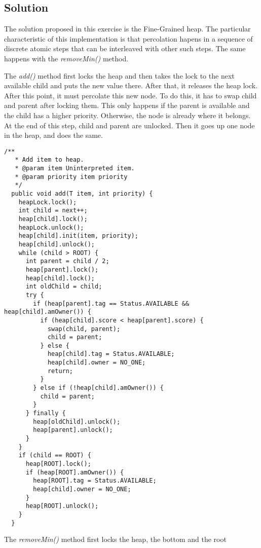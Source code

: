 \subsection{Solution}
\par
The solution proposed in this exercise is the Fine-Grained heap. The particular
characteristic of this implementation is that percolation hapens in a sequence
of discrete atomic steps that can be interleaved with other such steps. The same
happens with the \textit{removeMin()} method.
\par
The \textit{add()} method first locks the heap and then takes the lock to the
next available child and puts the new value there. After that, it releases the
heap lock. After this point, it must percolate this new node. To do this, it has
to swap child and parent after locking them. This only happens if the parent is
available and the child has a higher priority. Otherwise, the node is already
where it belongs. At the end of this step, child and parent are unlocked. Then
it goes up one node in the heap, and does the same.
\par
\hfill
\begin{lstlisting}[style=numbers]
  /**
   * Add item to heap.
   * @param item Uninterpreted item.
   * @param priority item priority
   */
  public void add(T item, int priority) {
    heapLock.lock();
    int child = next++;
    heap[child].lock();
    heapLock.unlock();
    heap[child].init(item, priority);
    heap[child].unlock();
    while (child > ROOT) {
      int parent = child / 2;
      heap[parent].lock();
      heap[child].lock();
      int oldChild = child;
      try {
        if (heap[parent].tag == Status.AVAILABLE && heap[child].amOwner()) {
          if (heap[child].score < heap[parent].score) {
            swap(child, parent);
            child = parent;
          } else {
            heap[child].tag = Status.AVAILABLE;
            heap[child].owner = NO_ONE;
            return;
          }
        } else if (!heap[child].amOwner()) {
          child = parent;
        }
      } finally {
        heap[oldChild].unlock();
        heap[parent].unlock();
      }
    }
    if (child == ROOT) {
      heap[ROOT].lock();
      if (heap[ROOT].amOwner()) {
        heap[ROOT].tag = Status.AVAILABLE;
        heap[child].owner = NO_ONE;
      }
      heap[ROOT].unlock();
    }
  }

\end{lstlisting}
\hfill
\par
The \textit{removeMin()} method first locks the heap, the bottom and the root

